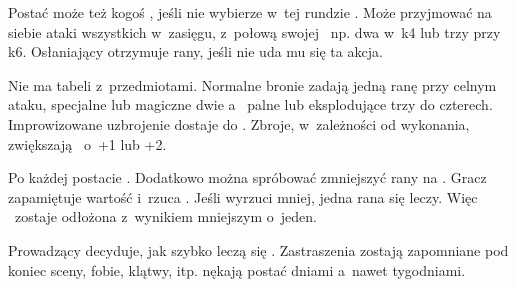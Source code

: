 {		Postać może też kogoś , jeśli nie wybierze w~tej rundzie \AD. Może przyjmować na siebie ataki wszystkich w~zasięgu, z~połową swojej \RD\, np. dwa w~k4 lub trzy przy k6. Osłaniający otrzymuje rany, jeśli nie uda mu się ta akcja.


		\noindent
		Nie ma tabeli z~przedmiotami. Normalne bronie zadają jedną ranę przy celnym ataku, specjalne lub magiczne dwie a~ palne lub eksplodujące trzy do czterech. Improwizowane uzbrojenie dostaje  do \AD. Zbroje, w~zależności od wykonania, zwiększają \RD\ o~+1 lub +2.


		\noindent
		Po każdej  postacie . Dodatkowo można spróbować zmniejszyć rany na \HD. Gracz zapamiętuje wartość i~rzuca \HD. Jeśli wyrzuci mniej, jedna rana się leczy. Więc \HD\ zostaje odłożona z~wynikiem mniejszym o~jeden.

		Prowadzący decyduje, jak szybko leczą się . Zastraszenia zostają zapomniane pod koniec sceny, fobie, klątwy, itp. nękają postać dniami a~nawet tygodniami.
}

